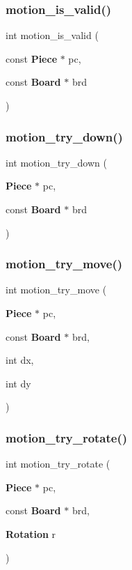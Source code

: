 \mbox{\label{motion_8c_ae67cef6a127c61180c181edb84120ef9}} 
\subsubsection{motion\+\_\+is\+\_\+valid()}
{\footnotesize\ttfamily int motion\+\_\+is\+\_\+valid (\begin{DoxyParamCaption}\item[{const \textbf{ Piece} $\ast$}]{pc,  }\item[{const \textbf{ Board} $\ast$}]{brd }\end{DoxyParamCaption})}

\mbox{\label{motion_8c_af0d588d036f656d0f629b8115b45df60}} 
\subsubsection{motion\+\_\+try\+\_\+down()}
{\footnotesize\ttfamily int motion\+\_\+try\+\_\+down (\begin{DoxyParamCaption}\item[{\textbf{ Piece} $\ast$}]{pc,  }\item[{const \textbf{ Board} $\ast$}]{brd }\end{DoxyParamCaption})}

\mbox{\label{motion_8c_a2cf016bccf6ca6fa09a3cb5362fbd6b7}} 
\subsubsection{motion\+\_\+try\+\_\+move()}
{\footnotesize\ttfamily int motion\+\_\+try\+\_\+move (\begin{DoxyParamCaption}\item[{\textbf{ Piece} $\ast$}]{pc,  }\item[{const \textbf{ Board} $\ast$}]{brd,  }\item[{int}]{dx,  }\item[{int}]{dy }\end{DoxyParamCaption})}

\mbox{\label{motion_8c_a89a0f1321575d3346ebd65f5e2953d71}} 
\subsubsection{motion\+\_\+try\+\_\+rotate()}
{\footnotesize\ttfamily int motion\+\_\+try\+\_\+rotate (\begin{DoxyParamCaption}\item[{\textbf{ Piece} $\ast$}]{pc,  }\item[{const \textbf{ Board} $\ast$}]{brd,  }\item[{\textbf{ Rotation}}]{r }\end{DoxyParamCaption})}


